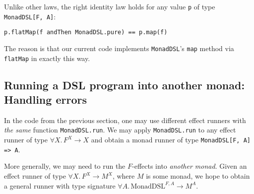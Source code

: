Unlike other laws, the right identity law holds for any value \lstinline!p!
of type \lstinline!MonadDSL[F, A]!:
\begin{lstlisting}
p.flatMap(f andThen MonadDSL.pure) == p.map(f)
\end{lstlisting}
The reason is that our current code implements \lstinline!MonadDSL!\textsf{'}s
\lstinline!map! method
via \lstinline!flatMap!
in exactly this way. 

\subsection{Running a DSL program into another monad: Handling errors}

In the code from the previous section, one may use different effect
runners with \emph{the same} function \lstinline!MonadDSL.run!.
We may apply \lstinline!MonadDSL.run!
to any effect runner of type $\forall X.\,F^{X}\rightarrow X$ and
obtain a monad runner of type \lstinline!MonadDSL[F, A] => A!.

More generally, we may need to run the $F$-effects into \emph{another
monad}. Given an effect runner of type $\forall X.\,F^{X}\rightarrow M^{X}$,
where $M$ is some monad, we hope to obtain a general runner with
type signature $\forall A.\,\text{MonadDSL}^{F,A}\rightarrow M^{A}$.

